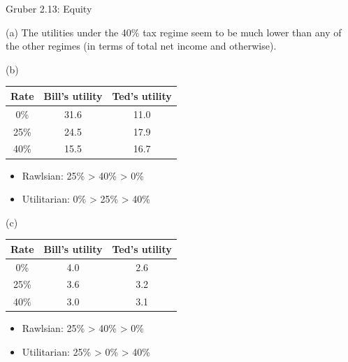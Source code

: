 \documentclass[10pt]{extarticle}
\begin{document}
\begin{problem}{Gruber 2.13: Equity}
\begin{enumerate}[(a)]
    \end{enumerate}
    \tcblower
    \begin{problem}{(a)}
      The utilities under the 40\% tax regime seem to be much lower than any of the other regimes (in terms of total net income and otherwise).
    \end{problem}
    \begin{problem}{(b)}
      \begin{center}
        \begin{tabular}{c|c|c}
          Rate & Bill's utility & Ted's utility\\
          \hline
          0\% & 31.6 & 11.0\\
          25\% & 24.5 & 17.9\\
          40\% & 15.5 & 16.7
        \end{tabular}
      \end{center}
      \begin{itemize}
        \item Rawlsian: 25\% > 40\% > 0\%
        \item Utilitarian: 0\% > 25\% > 40\%
      \end{itemize}
    \end{problem}
    \begin{problem}{(c)}
      \begin{center}
        \begin{tabular}{c|c|c}
          Rate & Bill's utility & Ted's utility\\
          \hline
          0\% & 4.0 & 2.6\\
          25\% & 3.6 & 3.2\\
          40\% & 3.0 & 3.1
        \end{tabular}
      \end{center}
      \begin{itemize}
        \item Rawlsian: 25\% > 40\% > 0\%
        \item Utilitarian: 25\% > 0\% > 40\%
      \end{itemize}
    \end{problem}
  \end{problem}
\end{document}
